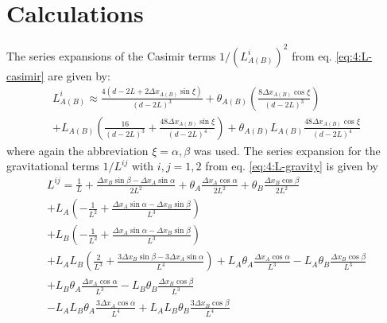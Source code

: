 \chapter{Calculations}\label{apx:average-density}

The series expansions of the Casimir terms $1/(L^i_{A(B)})^2$ from eq. \eqref{eq:4:L-casimir} are given by:
\begin{multline}
  L^i_{A(B)} \approx \frac{4(d - 2L + 2\Delta x_{A(B)} \sin\xi)}{(d-2L)^3}
  + \theta_{A(B)}\left(\frac{8\Delta x_{A(B)} \cos\xi}{(d-2L)^3}\right) \\
  + L_{A(B)}\left(\frac{16}{(d-2L)^3} + \frac{48\Delta x_{A(B)} \sin\xi}{(d-2L)^4}\right) + \theta_{A(B)}L_{A(B)}\frac{48\Delta x_{A(B)} \cos\xi}{(d-2L)^4}
\end{multline}
where again the abbreviation $\xi = \alpha,\beta$ was used. The series expansion for the gravitational terms $1/L^{ij}$ with $i,j = 1,2$ from eq. \eqref{eq:4:L-gravity} is given by
\begin{multline}
  L^{ij} = \frac{1}{L} + \frac{\Delta x_B \sin\beta - \Delta x_A \sin\alpha}{2L^2} + \theta_A\frac{\Delta x_A\cos\alpha}{2L^2} + \theta_B\frac{\Delta x_B\cos\beta}{2L^2} \\
  + L_A \left(-\frac{1}{L^2} + \frac{\Delta x_A \sin\alpha-\Delta x_B \sin\beta}{L^3}\right) \\
  + L_B \left(-\frac{1}{L^2} + \frac{\Delta x_A \sin\alpha-\Delta x_B \sin\beta}{L^3}\right) \\
  + L_A L_B \left(\frac{2}{L^3} + \frac{3\Delta x_B \sin\beta - 3 \Delta x_A \sin\alpha}{L^4}\right)
  + L_A \theta_A \frac{\Delta x_A \cos\alpha}{L^3} - L_A \theta_B \frac{\Delta x_B \cos\beta}{L^3} \\
  + L_B \theta_A \frac{\Delta x_A \cos\alpha}{L^3} - L_B \theta_B \frac{\Delta x_B \cos\beta}{L^3} \\
  - L_A L_B \theta_A \frac{3 \Delta x_A \cos\alpha}{L^4} + L_A L_B \theta_B \frac{3 \Delta x_B \cos\beta}{L^4}
\end{multline}
